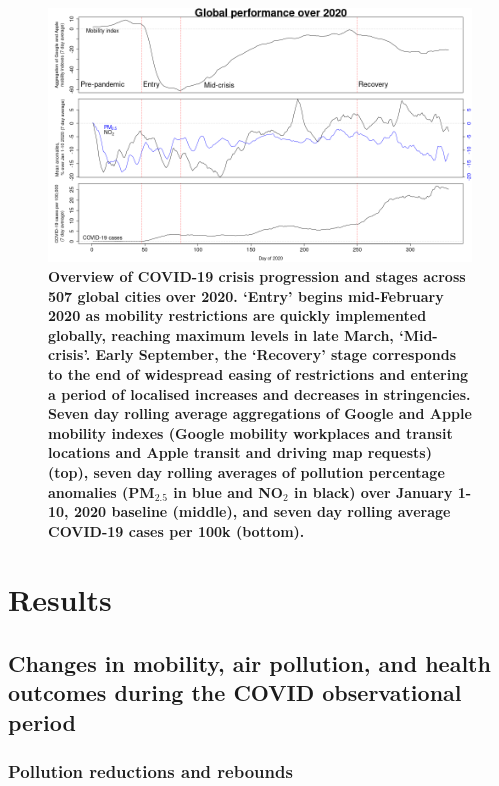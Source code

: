 \documentclass[preprint,10pt]{elsarticle} %
\begin{document}
\begin{figure}
\centering
\includegraphics[trim={0 0 15 20},clip,scale=0.45]{Images/LancetPHOverall.png}
\caption{\bf Overview of COVID-19 crisis progression and stages across 507 global cities over 2020. `Entry' begins mid-February 2020 as mobility restrictions are quickly implemented globally, reaching maximum levels in late March, `Mid-crisis'. Early September, the `Recovery' stage corresponds to the end of widespread easing of restrictions and entering a period of localised increases and decreases in stringencies. Seven day rolling average aggregations of Google and Apple mobility indexes (Google mobility workplaces and transit locations and Apple transit and driving map requests) (top), seven day rolling averages of pollution percentage anomalies (PM$_{2.5}$ in blue and NO$_{2}$ in black) over January 1-10, 2020 baseline (middle), and seven day rolling average COVID-19 cases per 100k (bottom).}
 \label{fig:stages}
\end{figure}

\section*{Results}
\subsection*{Changes in mobility, air pollution, and health outcomes during the COVID observational period}
\subsubsection*{Pollution reductions and rebounds}
\end{document}
